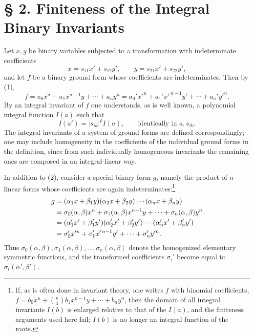 \documentclass[11pt]{article}
\begin{document}
\setcounter{equation}{0}
\section*{§ 2. Finiteness of the Integral Binary Invariants}

Let \(x,y\) be binary variables subjected to a transformation with indeterminate coefficients
\begin{equation}
        x=s_{11}x'+s_{12}y',\qquad y=s_{21}x'+s_{22}y',
\end{equation}
and let \(f\) be a binary ground form whose coefficients are indeterminates. Then by (1),
\begin{equation}
        f=a_0x^n+a_1x^{n-1}y+\cdots+a_ny^n
        =a_0'x'^n+a_1'x'^{\,n-1}y'+\cdots+a_n'y'^n.
\end{equation}
By an integral invariant of \(f\) one understands, as is well known, a polynomial integral function \(I(a)\) such that
\begin{equation}
        I(a')=|s_{ik}|^\rho I(a),\qquad \text{identically in \(a,s_{ik}\)}.
\end{equation}
The integral invariants of a system of ground forms are defined correspondingly; one may include homogeneity in the coefficients of the individual ground forms in the definition, since from such individually homogeneous invariants the remaining ones are composed in an integral-linear way.

In addition to (2), consider a special binary form \(g\), namely the product of \(n\) linear forms whose coefficients are again indeterminates:\footnote{If, as is often done in invariant theory, one writes \(f\) with binomial coefficients, \(f=b_0x^n+\binom n1b_1x^{n-1}y+\cdots+b_ny^n\), then the domain of all integral invariants \(I(b)\) is enlarged relative to that of the \(I(a)\), and the finiteness arguments used here fail; \(I(b)\) is no longer an integral function of the roots.}
\begin{align}
        g&=(\alpha_1x+\beta_1y)(\alpha_2x+\beta_2y)\cdots(\alpha_nx+\beta_ny)\notag\\
         &=\sigma_0(\alpha,\beta)x^n+\sigma_1(\alpha,\beta)x^{n-1}y+\cdots+\sigma_n(\alpha,\beta)y^n\notag\\
         &=(\alpha_1'x'+\beta_1'y')(\alpha_2'x'+\beta_2'y')\cdots(\alpha_n'x'+\beta_n'y')\notag\\
         &=\sigma_0'x'^n+\sigma_1'x'^{\,n-1}y'+\cdots+\sigma_n'y'^n.
\end{align}
Thus \(\sigma_0(\alpha,\beta),\sigma_1(\alpha,\beta),\ldots,\sigma_n(\alpha,\beta)\) denote the homogenized elementary symmetric functions, and the transformed coefficients \(\sigma_i'\) become equal to \(\sigma_i(\alpha',\beta')\).
\end{document}
